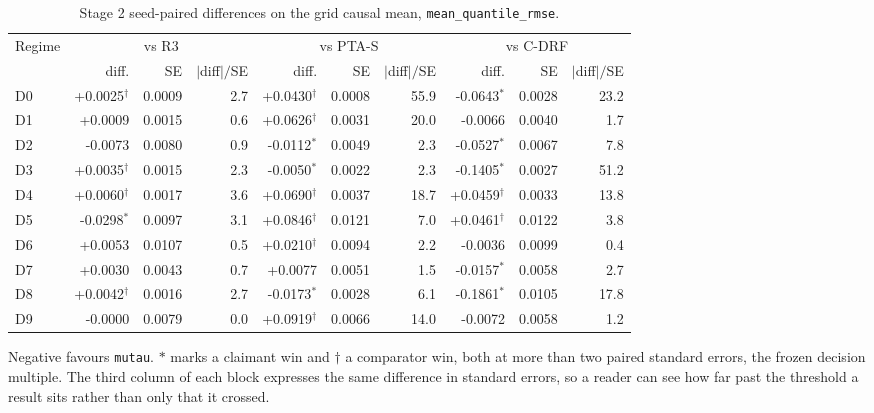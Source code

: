 \begin{table}[htbp]
\centering
\caption{Stage 2 seed-paired differences on the grid causal mean, \texttt{mean\_quantile\_rmse}.}
\label{tab:p55s2-paired-meanq}
\scriptsize
\setlength{\tabcolsep}{4pt}
\begin{tabular}{@{}lrrrrrrrrr@{}}
\toprule
Regime & \multicolumn{3}{c}{vs R3} & \multicolumn{3}{c}{vs PTA-S} & \multicolumn{3}{c}{vs C-DRF} \\
  & diff. & SE & $|$diff$|/$SE & diff. & SE & $|$diff$|/$SE & diff. & SE & $|$diff$|/$SE \\
\midrule
D0 & +0.0025$^{\dagger}$ & 0.0009 & 2.7 & +0.0430$^{\dagger}$ & 0.0008 & 55.9 & -0.0643$^{\ast}$ & 0.0028 & 23.2 \\
D1 & +0.0009 & 0.0015 & 0.6 & +0.0626$^{\dagger}$ & 0.0031 & 20.0 & -0.0066 & 0.0040 & 1.7 \\
D2 & -0.0073 & 0.0080 & 0.9 & -0.0112$^{\ast}$ & 0.0049 & 2.3 & -0.0527$^{\ast}$ & 0.0067 & 7.8 \\
D3 & +0.0035$^{\dagger}$ & 0.0015 & 2.3 & -0.0050$^{\ast}$ & 0.0022 & 2.3 & -0.1405$^{\ast}$ & 0.0027 & 51.2 \\
D4 & +0.0060$^{\dagger}$ & 0.0017 & 3.6 & +0.0690$^{\dagger}$ & 0.0037 & 18.7 & +0.0459$^{\dagger}$ & 0.0033 & 13.8 \\
D5 & -0.0298$^{\ast}$ & 0.0097 & 3.1 & +0.0846$^{\dagger}$ & 0.0121 & 7.0 & +0.0461$^{\dagger}$ & 0.0122 & 3.8 \\
D6 & +0.0053 & 0.0107 & 0.5 & +0.0210$^{\dagger}$ & 0.0094 & 2.2 & -0.0036 & 0.0099 & 0.4 \\
D7 & +0.0030 & 0.0043 & 0.7 & +0.0077 & 0.0051 & 1.5 & -0.0157$^{\ast}$ & 0.0058 & 2.7 \\
D8 & +0.0042$^{\dagger}$ & 0.0016 & 2.7 & -0.0173$^{\ast}$ & 0.0028 & 6.1 & -0.1861$^{\ast}$ & 0.0105 & 17.8 \\
D9 & -0.0000 & 0.0079 & 0.0 & +0.0919$^{\dagger}$ & 0.0066 & 14.0 & -0.0072 & 0.0058 & 1.2 \\
\bottomrule
\end{tabular}
\par\vspace{2pt}\parbox{0.96\textwidth}{\scriptsize Negative favours \texttt{mutau}. $\ast$ marks a claimant win and $\dagger$ a comparator win, both at more than two paired standard errors, the frozen decision multiple. The third column of each block expresses the same difference in standard errors, so a reader can see how far past the threshold a result sits rather than only that it crossed.}
\end{table}

